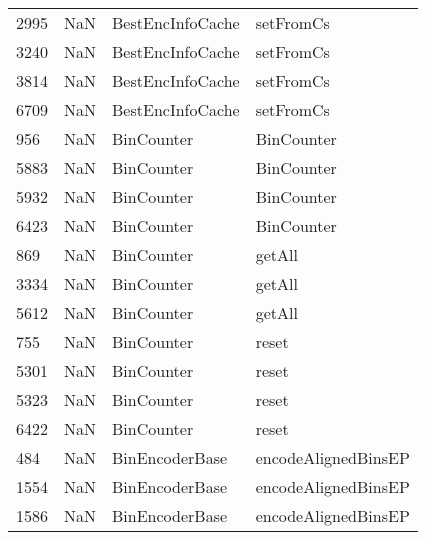 \begin{tabular}{llll}
2995 &                   NaN &           BestEncInfoCache &                                 setFromCs \\
3240 &                   NaN &           BestEncInfoCache &                                 setFromCs \\
3814 &                   NaN &           BestEncInfoCache &                                 setFromCs \\
6709 &                   NaN &           BestEncInfoCache &                                 setFromCs \\
956  &                   NaN &                 BinCounter &                                BinCounter \\
5883 &                   NaN &                 BinCounter &                                BinCounter \\
5932 &                   NaN &                 BinCounter &                                BinCounter \\
6423 &                   NaN &                 BinCounter &                                BinCounter \\
869  &                   NaN &                 BinCounter &                                    getAll \\
3334 &                   NaN &                 BinCounter &                                    getAll \\
5612 &                   NaN &                 BinCounter &                                    getAll \\
755  &                   NaN &                 BinCounter &                                     reset \\
5301 &                   NaN &                 BinCounter &                                     reset \\
5323 &                   NaN &                 BinCounter &                                     reset \\
6422 &                   NaN &                 BinCounter &                                     reset \\
484  &                   NaN &             BinEncoderBase &                       encodeAlignedBinsEP \\
1554 &                   NaN &             BinEncoderBase &                       encodeAlignedBinsEP \\
1586 &                   NaN &             BinEncoderBase &                       encodeAlignedBinsEP \\

\end{tabular}
